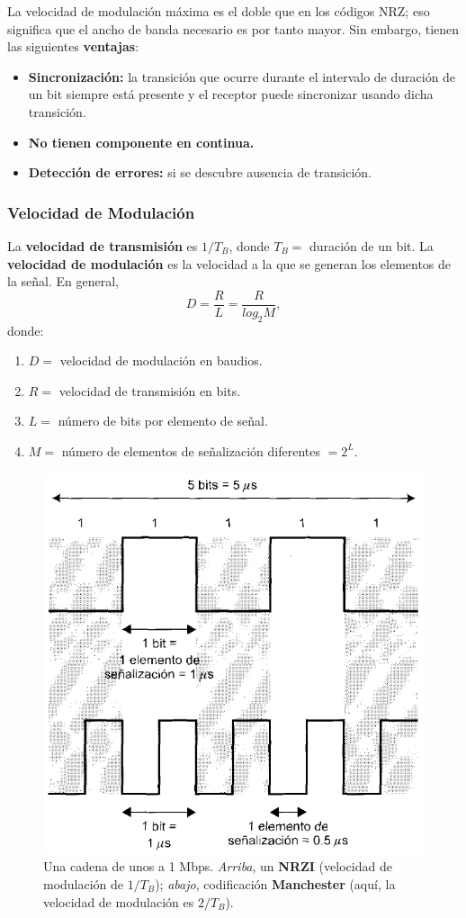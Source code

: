 \documentclass[10pt,a4paper]{article}
\begin{document}
La  velocidad de modulación máxima es el doble que en los códigos NRZ; eso significa que el ancho de banda necesario es por tanto mayor. Sin embargo, tienen las siguientes \textbf{ventajas}:
\begin{itemize}
\item \textbf{Sincronización:} la transición que ocurre durante el intervalo de duración de un bit siempre está presente y el receptor puede sincronizar usando dicha transición.
\item \textbf{No tienen componente en continua.}
\item \textbf{Detección de errores:} si se descubre ausencia de transición.
\end{itemize}

\subsubsection{Velocidad de Modulación}

La \textbf{velocidad de transmisión} es $1/T_B$, donde $T_B=$ duración de un bit. La \textbf{velocidad de modulación} es la velocidad a la que se generan los elementos de la señal. En general,
\[D = \frac{R}{L} = \frac{R}{log_2 M},\]
donde:
\begin{enumerate}[ ]
\item $D=$ velocidad de modulación en baudios.
\item $R=$ velocidad de transmisión en bits.
\item $L=$ número de bits por elemento de señal.
\item $M=$ número de elementos de señalización diferentes $=2^L$.
\end{enumerate}

\begin{figure}[ht!]
  \caption{Una cadena de unos a 1 Mbps. \textit{Arriba}, un \textbf{NRZI} (velocidad de modulación de $1/T_B$); \textit{abajo}, codificación \textbf{Manchester} (aquí, la velocidad de modulación es $2/T_B$).}
  \label{fig:vel_modulacion}  
  \centerline{
	\includegraphics[width=0.6\textwidth-\fboxrule-\fboxrule]{imgs/vel_modulacion.png}}
\end{figure}
\end{document}
